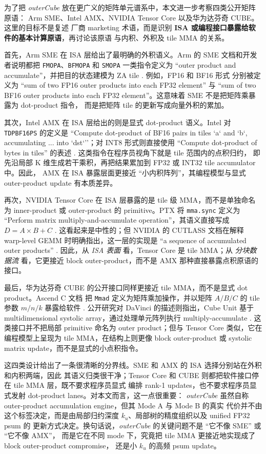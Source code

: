 \documentclass[UTF8,11pt,a4paper]{ctexart}
\newcommand{\ku}{\ensuremath{k_u}}
\newcommand{\modea}{Mode A}
\newcommand{\modeb}{Mode B}
\newcommand{\outercube}{\textit{outerCube}}
\begin{document}
为了把 \outercube{} 放在更广义的矩阵单元谱系中，本文进一步考察四类公开矩阵原语：
Arm SME、Intel AMX、NVIDIA Tensor Core 以及华为达芬奇 CUBE。这里的目标不是复述
厂商 marketing 术语，而是识别 \textbf{ISA 或编程接口暴露给软件的基本计算原语}，再讨论该原语
与内积、外积及 tile MMA 的关系。

首先，Arm SME 在 ISA 层给出了最明确的外积语义。Arm 的 SME 文档和开发者说明都把
\texttt{FMOPA}、\texttt{BFMOPA} 和 \texttt{SMOPA} 一类指令定义为 ``outer product and
accumulate''，并把目的状态建模为 ZA tile \cite{smeintro,smeinst}. 例如，FP16 和 BF16 形式
分别被定义为 ``sum of two FP16 outer products into each FP32 element'' 与 ``sum of two BF16
outer products into each FP32 element''。这意味着 SME 不是把矩阵乘暴露为 dot-product 指令，
而是把矩阵 tile 的更新写成向量外积的累加。

其次，Intel AMX 在 ISA 层给出的则是显式 dot-product 语义。Intel 对
\texttt{TDPBF16PS} 的定义是 ``Compute dot-product of BF16 pairs in tiles `a` and `b`,
accumulating ... into `dst`''；对 INT8 形式则直接使用 ``Compute dot-product of bytes in
tiles'' 的表述 \cite{amxbf16,amxsample}. 这类指令在程序员视角下就是 tile 范围内的点积归约，
即先沿局部 K 维生成若干乘积，再把结果累加到 FP32 或 INT32 tile accumulator 中。因此，
AMX 在 ISA 暴露层面更接近 ``小内积阵列''，其编程模型与显式 outer-product update 有本质差异。

再次，NVIDIA Tensor Core 在 ISA 层暴露的是 tile 级 MMA，而不是单独命名为 inner-product 或
outer-product 的 primitive。PTX 将 \texttt{mma.sync} 定义为 ``Perform matrix multiply-and-accumulate
operation''，其语义直接写成 $D=A\times B+C$ \cite{ptxisa}. 这看起来是中性的；但 NVIDIA 的
CUTLASS 文档在解释 warp-level GEMM 时明确指出，这一层的实现是 ``a sequence of accumulated
outer products'' \cite{cutlass}. 因此，从 \emph{ISA 表面} 看，Tensor Core 是 tile MMA；从
\emph{分块数据流} 看，它更接近 block outer-product，而不是 AMX 那种直接暴露点积原语的接口。

最后，华为达芬奇 CUBE 的公开接口同样更接近 tile MMA，而不是显式 dot product。Ascend C 文档
把 \texttt{Mmad} 定义为矩阵乘加操作，并以矩阵 $A/B/C$ 的 tile 参数 $m/n/k$ 暴露给软件
\cite{ascendmmad}. 公开研究对 DaVinci 的描述则指出，Cube Unit 基于 multidimensional systolic
array，通过处理单元阵列执行 multiply-accumulate \cite{davinci}. 这类接口并不把局部 primitive
命名为 outer product；但与 Tensor Core 类似，它在编程模型上呈现为 tile MMA，在结构上则更像
block outer-product 或 systolic matrix update，而不是显式的小点积指令。

这四类设计给出了一条很清晰的分界线。SME 和 AMX 的 ISA 选择分别站在外积和内积两端，因此
其语义归类很干净；Tensor Core 和 CUBE 则都把软件接口停在 tile MMA 层，既不要求程序员显式
编排 rank-1 updates，也不要求程序员显式发射 dot-product lanes。对本文而言，这一点很重要：
\outercube{} 虽然自称 outer-product accumulation engine，但其 \modea{} 与 \modeb{} 的真实
代价并不由这个标签决定，而是由局部归约深度 \ku{}、局部树的精度组织以及 unified FP32 psum 的
更新方式决定。换句话说，\outercube{} 的关键问题不是 ``它不像 SME'' 或 ``它不像 AMX''，
而是它在不同 mode 下，究竟把 tile MMA 更接近地实现成了 block outer-product compromise，
还是小 \ku{} 的高频 psum update。
\end{document}
